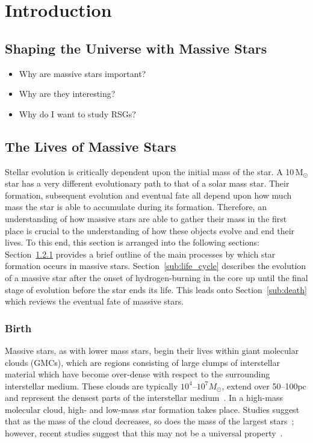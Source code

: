 \chapter{Introduction}\label{ch:intro}

\section{Shaping the Universe with Massive Stars} %
\label{sec:massive_stars}

\begin{itemize}
    \item Why are massive stars important?
    \item Why are they interesting?
    \item Why do I want to study RSGs?
\end{itemize}


\section{The Lives of Massive Stars} %
\label{sec:the_life_of_a_red_supergiant}

Stellar evolution is critically dependent upon the initial mass of the star.
A 10\,M$_{\odot}$ star has a very different evolutionary path to that of a solar mass star.
Their formation, subsequent evolution and eventual fate all depend upon how much mass the star is able to accumulate during its formation.
Therefore, an understanding of how massive stars are able to gather their mass in the first place is crucial to the understanding of how these objects evolve and end their lives.
To this end, this section is arranged into the following sections: Section~\ref{sub:birth} provides a brief outline of the main processes by which star formation occurs in massive stars.
Section~\ref{sub:life_cycle} describes the evolution of a massive star after the onset of hydrogen-burning in the core up until the final stage of evolution before the star ends its life.
This leads onto Section~\ref{sub:death} which reviews the eventual fate of massive stars.

\subsection{Birth} %
\label{sub:birth}

Massive stars, as with lower mass stars, begin their lives within giant molecular clouds (GMCs), which are regions consisting of large clumps of interstellar material which have become over-dense with respect to the surrounding interstellar medium.
These clouds are typically $10^{4}$--$10^{7}M_{\odot}$, extend over 50--100pc and represent the densest parts of the interstellar medium~\citep{Fukui10}.
In a high-mass molecular cloud, high- and low-mass star formation takes place.
Studies suggest that as the mass of the cloud decreases, so does the mass of the largest stars~\citep{Fukui10,Weidner10}; however, recent studies suggest that this may not be a universal property~\citep[e.g.][]{Bressert12}.

